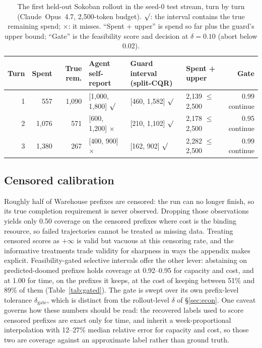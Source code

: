 \documentclass{article}
\begin{document}
\begin{table}[H]
\centering
\caption{The first held-out Sokoban rollout in the seed-0 test stream, turn by turn (Claude~Opus~4.7, 2{,}500-token budget). $\surd$: the interval contains the true remaining spend; $\times$: it misses. ``Spent + upper'' is spend so far plus the guard's upper bound; ``Gate'' is the feasibility score and decision at $\delta{=}0.10$ (abort below 0.02).}
\label{tab:case_study}
\footnotesize
\setlength{\tabcolsep}{4pt}
\begin{tabular}{@{}rrrlllr@{}}
\toprule
Turn & Spent & True rem. & Agent self-report & Guard interval (split-CQR) & Spent + upper & Gate \\
\midrule
1 & 557 & 1{,}090 & [1{,}000, 1{,}800] $\surd$ & [460, 1{,}582] $\surd$ & 2{,}139 $\leq$ 2{,}500 & 0.99 continue \\
2 & 1{,}076 & 571 & [600, 1{,}200] $\times$ & [210, 1{,}102] $\surd$ & 2{,}178 $\leq$ 2{,}500 & 0.95 continue \\
3 & 1{,}380 & 267 & [400, 900] $\times$ & [162, 902] $\surd$ & 2{,}282 $\leq$ 2{,}500 & 0.99 continue \\
\bottomrule
\end{tabular}
\end{table}

\subsection{Censored calibration}
\label{sec:censored}

Roughly half of Warehouse prefixes are censored: the run can no longer finish, so its true completion requirement is never observed. Dropping those observations yields only 0.50 coverage on the censored prefixes where cost is the binding resource, so failed trajectories cannot be treated as missing data. Treating censored scores as $+\infty$ is valid but vacuous at this censoring rate, and the informative treatments trade validity for sharpness in ways the appendix makes explicit. Feasibility-gated selective intervals offer the other lever: abstaining on predicted-doomed prefixes holds coverage at 0.92--0.95 for capacity and cost, and at 1.00 for time, on the prefixes it keeps, at the cost of keeping between 51\% and 89\% of them (Table~\ref{tab:gated}). The gate is swept over its own prefix-level tolerance $\delta_{\mathrm{gate}}$, which is distinct from the rollout-level $\delta$ of \S\ref{sec:econ}. One caveat governs how these numbers should be read: the recovered labels used to score censored prefixes are exact only for time, and inherit a week-proportional interpolation with 12--27\% median relative error for capacity and cost, so those two are coverage against an approximate label rather than ground truth.
\end{document}

